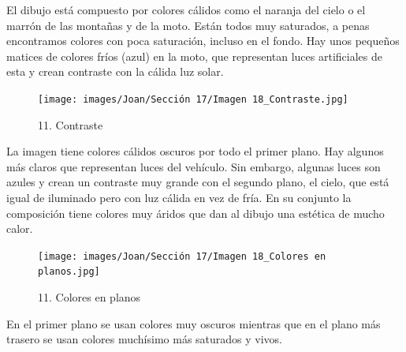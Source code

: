 \documentclass[12pt]{article}
\begin{document}
            El dibujo está compuesto por colores cálidos como el naranja del cielo o el marrón de las montañas y de la moto. Están todos muy saturados, a penas encontramos colores con poca saturación, incluso en el fondo. 
    Hay unos pequeños matices de colores fríos (azul) en la moto, que representan luces artificiales de esta y crean contraste con la cálida luz solar. 

            \begin{figure}[H]
          \centering
          \texttt{[image: images/Joan/Sección 17/Imagen 18\_Contraste.jpg]}
          \caption{\small 11. Contraste}
        \end{figure}
        La imagen tiene colores cálidos oscuros por todo el primer plano. Hay algunos más claros que representan luces del vehículo. Sin embargo, algunas luces son azules y crean un contraste muy grande con el segundo plano, el cielo, que está igual de iluminado pero con luz cálida en vez de fría. 
    En su conjunto la composición tiene colores muy áridos que dan al dibujo una estética de mucho calor. 

        \begin{figure}[H]
          \centering
          \texttt{[image: images/Joan/Sección 17/Imagen 18\_Colores en planos.jpg]}
          \caption{\small 11. Colores en planos}
        \end{figure}

        En el primer plano se usan colores muy oscuros mientras que en el plano más trasero se usan colores muchísimo más saturados y vivos. 

        
\end{document}
